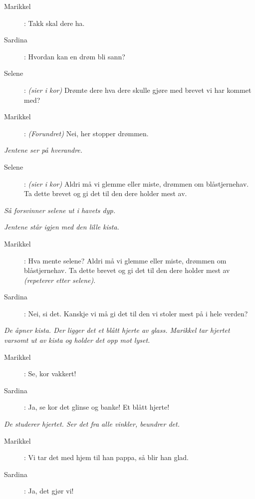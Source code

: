 {\begin{description}
\item[Marikkel]: Takk skal dere ha. 
\item[Sardina]: Hvordan kan en drøm bli sann? 
\item[Selene]: \textit{\color{gray} (sier i kor)} Drømte dere hva dere skulle gjøre med brevet vi har kommet med? 
\item[Marikkel]: \textit{\color{gray} (Forundret)} Nei, her stopper drømmen. 
\end{description}

\noindent \textit{\color{gray} Jentene ser på hverandre.}

\begin{description}
\item[Selene]: \textit{\color{gray} (sier i kor)} Aldri må vi glemme eller miste, drømmen om blåstjernehav. Ta dette brevet og gi det til den dere holder mest av. 
\end{description}

\noindent \textit{\color{gray} Så forsvinner selene ut i havets dyp.}

\noindent \textit{\color{gray} Jentene står igjen med den lille kista.} 

\begin{description}
\item[Marikkel]: Hva mente selene? Aldri må vi glemme eller miste, drømmen om blåstjernehav. Ta dette brevet og gi det til den dere holder mest av \textit{\color{gray} (repeterer etter selene)}. 
\item[Sardina]: Nei, si det. Kanskje vi må gi det til den vi stoler mest på i hele verden? 
\end{description}

\noindent \textit{\color{gray} De åpner kista. Der ligger det et blått hjerte av glass. Marikkel tar hjertet varsomt ut av kista og holder det opp mot lyset.}

\begin{description}
\item[Marikkel]: Se, kor vakkert!
\item[Sardina]: Ja, se kor det glinse og banke! Et blått hjerte!
\end{description}

\noindent \textit{\color{gray} De studerer hjertet. Ser det fra alle vinkler, beundrer det.}

\begin{description}
\item[Marikkel]: Vi tar det med hjem til han pappa, så blir han glad.
\item[Sardina]: Ja, det gjør vi!
\end{description}

}
